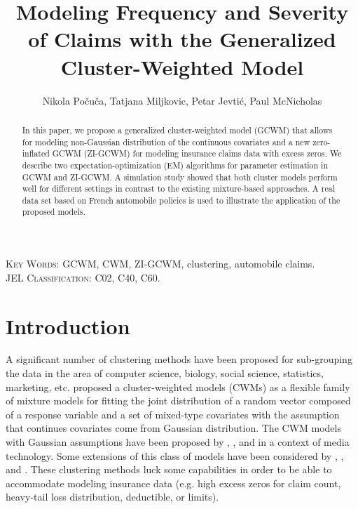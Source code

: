 \documentclass[11pt,letterpaper]{article}
\numberwithin{equation}{section}
\numberwithin{equation}{section}
\numberwithin{equation}{section}
\begin{document}
\title{\bf Modeling  Frequency and Severity of Claims with the Generalized  Cluster-Weighted Model}

\author{Nikola Po\v cu\v ca, Tatjana Miljkovic,  Petar Jevti\' c, Paul McNicholas  }%

\maketitle
\doublespacing
\small

\begin{abstract}

In this paper, we propose a generalized cluster-weighted model (GCWM) that allows for modeling non-Gaussian distribution of the continuous covariates and a new zero-inflated GCWM (ZI-GCWM) for modeling insurance claims data with excess zeros. We describe two expectation-optimization (EM) algorithms for parameter estimation in GCWM and ZI-GCWM. A simulation study showed that both cluster models perform well for different settings in contrast to the existing mixture-based approaches. A real data set based on French automobile policies is used to illustrate the application of the proposed models.

\end{abstract}
\textsc{Key Words:} GCWM, CWM, ZI-GCWM, clustering, automobile claims.\\
\textsc{JEL Classification:}  C02, C40, C60.\\
\section{Introduction}\label{sec:introduction}
A significant number of clustering methods have been proposed for sub-grouping the data in the area of computer science, biology, social science, statistics, marketing, etc. \cite{Ingrassia+Punzo+Vittadini+Minotti:2015} proposed a cluster-weighted models (CWMs) as a flexible family of mixture models for fitting the joint distribution of a random vector composed of a response variable and a set of mixed-type covariates with the assumption that continues covariates come from Gaussian distribution. The CWM models with Gaussian assumptions have been proposed by \cite{Gershenfeld:1997}, \cite{Gershenfeld:Schoner+Metois:1999}, and \cite{Gershenfeld:1999} in a context of media technology. Some extensions of this class of models have been considered by \cite{Punzo+Ingrassia:2015}, \cite{Ingrassia+Minotti+Punzo:2014}, and \cite{Ingrassia+Minotti+Vittadini:2012}. These clustering methods luck some capabilities in order to be able to accommodate modeling insurance data (e.g. high excess zeros for claim count, heavy-tail loss distribution, deductible, or limits).
\end{document}
